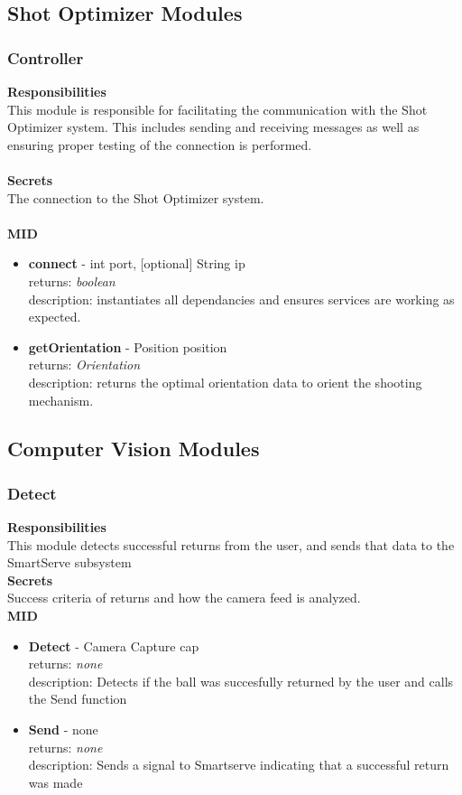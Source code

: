 \documentclass[11pt]{article}
\begin{document}
\subsection{Shot Optimizer Modules}
\subsubsection*{Controller}
\textbf{Responsibilities} \\
This module is responsible for facilitating the communication with the Shot Optimizer system. This includes sending and receiving messages as well as ensuring proper testing of the connection is performed. \\ \\
\textbf{Secrets} \\ 
The connection to the Shot Optimizer system. \\ \\
\textbf{MID} 
\begin{itemize}
\item \textbf{connect} - int  port, [optional] String ip \\ returns: \textit{boolean} \\ description: instantiates all dependancies and ensures services are working as expected.
\item \textbf{getOrientation} - Position  position \\ returns: \textit{Orientation} \\ description: returns the optimal orientation data to orient the shooting mechanism.
\end{itemize}

\subsection{Computer Vision Modules}
\subsubsection*{Detect}
\textbf{Responsibilities} \\
This module detects successful returns from the user, and sends that data to the SmartServe subsystem\\
\textbf{Secrets} \\ 
Success criteria of returns and how the camera feed is analyzed.\\ 
\textbf{MID} 
\begin{itemize}
\item \textbf{Detect} - Camera Capture cap \\ returns: \textit{none} \\ description: Detects if the ball was succesfully returned by the user and calls the Send function
\item \textbf{Send} -  none \\ returns: \textit{none} \\ description: Sends a signal to Smartserve indicating that a successful return was made
\end{itemize}
\end{document}
